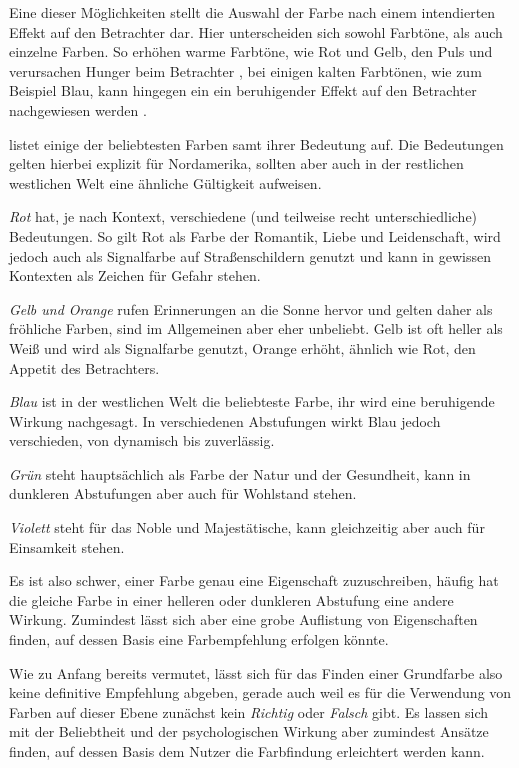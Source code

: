 Eine dieser Möglichkeiten stellt die Auswahl der Farbe nach einem intendierten Effekt auf den Betrachter dar.
Hier unterscheiden sich sowohl Farbtöne, als auch einzelne Farben.
So erhöhen warme Farbtöne, wie Rot und Gelb, den Puls und verursachen Hunger beim Betrachter \cite{berman2010street},
bei einigen kalten Farbtönen, wie zum Beispiel Blau, kann hingegen ein ein beruhigender Effekt auf den Betrachter nachgewiesen werden \cite{crozier1999meanings}.

\cite{berman2010street} listet einige der beliebtesten Farben samt ihrer Bedeutung auf. Die Bedeutungen gelten hierbei explizit für Nordamerika, sollten aber auch in der restlichen westlichen Welt eine ähnliche Gültigkeit aufweisen.

\textit{Rot} hat, je nach Kontext, verschiedene (und teilweise recht unterschiedliche) Bedeutungen. So gilt Rot als Farbe der Romantik, Liebe und Leidenschaft, wird jedoch auch als Signalfarbe auf Straßenschildern genutzt und kann in gewissen Kontexten als Zeichen für Gefahr stehen.

\textit{Gelb und Orange} rufen Erinnerungen an die Sonne hervor und gelten daher als fröhliche Farben, sind im Allgemeinen aber eher unbeliebt. Gelb ist oft heller als Weiß und wird als Signalfarbe genutzt, Orange erhöht, ähnlich wie Rot, den Appetit des Betrachters.

\textit{Blau} ist in der westlichen Welt die beliebteste Farbe, ihr wird eine beruhigende Wirkung nachgesagt. In verschiedenen Abstufungen wirkt Blau jedoch verschieden, von dynamisch bis zuverlässig.

\textit{Grün} steht hauptsächlich als Farbe der Natur und der Gesundheit, kann in dunkleren Abstufungen aber auch für Wohlstand stehen.

\textit{Violett} steht für das Noble und Majestätische, kann gleichzeitig aber auch für Einsamkeit stehen.

Es ist also schwer, einer Farbe genau eine Eigenschaft zuzuschreiben, häufig hat die gleiche Farbe in einer helleren oder dunkleren Abstufung eine andere Wirkung. Zumindest lässt sich aber eine grobe Auflistung von Eigenschaften finden, auf dessen Basis eine Farbempfehlung erfolgen könnte.

Wie zu Anfang bereits vermutet, lässt sich für das Finden einer Grundfarbe also keine definitive Empfehlung abgeben, gerade auch weil es für die Verwendung von Farben auf dieser Ebene zunächst kein \textit{Richtig} oder \textit{Falsch} gibt. Es lassen sich mit der Beliebtheit und der psychologischen Wirkung aber zumindest Ansätze finden, auf dessen Basis dem Nutzer die Farbfindung erleichtert werden kann.

